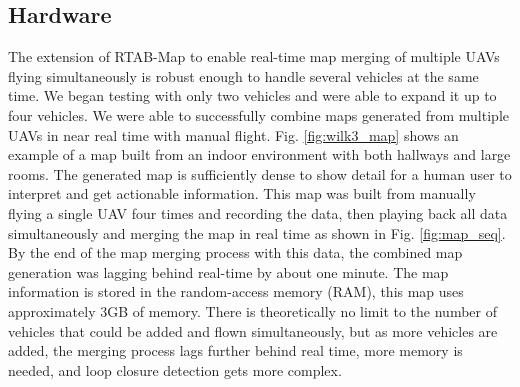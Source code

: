 \documentclass[letterpaper, 10 pt, conference]{ieeeconf}  %
\begin{document}
\subsection{Hardware}

The extension of RTAB-Map to enable real-time map merging of multiple UAVs flying simultaneously is robust enough to handle several vehicles at the same time. We began testing with only two vehicles and were able to expand it up to four vehicles. We were able to successfully combine maps generated from multiple UAVs in near real time with manual flight. Fig. \ref{fig:wilk3_map} shows an example of a map built from an indoor environment with both hallways and large rooms. The generated map is sufficiently dense to show detail for a human user to interpret and get actionable information. This map was built from manually flying a single UAV four times and recording the data, then playing back all data simultaneously and merging the map in real time as shown in Fig. \ref{fig:map_seq}. By the end of the map merging process with this data, the combined map generation was lagging behind real-time by about one minute. The map information is stored in the random-access memory (RAM), this map uses approximately 3GB of memory. There is theoretically no limit to the number of vehicles that could be added and flown simultaneously, but as more vehicles are added, the merging process lags further behind real time, more memory is needed, and loop closure detection gets more complex.
\end{document}
